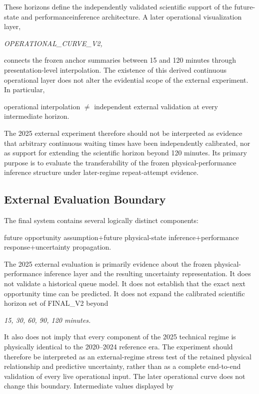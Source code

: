 These horizons define the independently validated scientific support of the future-state and performanceinference architecture. A later operational visualization layer,

\begin{center}\textit{OPERATIONAL\_CURVE\_V2,}\end{center}

connects the frozen anchor summaries between 15 and 120 minutes through presentation-level interpolation. The existence of this derived continuous operational layer does not alter the evidential scope of the external experiment. In particular,

operational interpolation \ensuremath{\neq} independent external validation at every intermediate horizon.

The 2025 external experiment therefore should not be interpreted as evidence that arbitrary continuous waiting times have been independently calibrated, nor as support for extending the scientific horizon beyond 120 minutes. Its primary purpose is to evaluate the transferability of the frozen physical-performance inference structure under later-regime repeat-attempt evidence.

\subsection{External Evaluation Boundary}
The final system contains several logically distinct components:

future opportunity assumption+future physical-state inference+performance response+uncertainty propagation.

The 2025 external evaluation is primarily evidence about the frozen physical-performance inference layer and the resulting uncertainty representation. It does not validate a historical queue model. It does not establish that the exact next opportunity time can be predicted. It does not expand the calibrated scientific horizon set of FINAL\_V2 beyond

\begin{center}\textit{15, 30, 60, 90, 120 minutes.}\end{center}

It also does not imply that every component of the 2025 technical regime is physically identical to the 2020--2024 reference era. The experiment should therefore be interpreted as an external-regime stress test of the retained physical relationship and predictive uncertainty, rather than as a complete end-to-end validation of every live operational input. The later operational curve does not change this boundary. Intermediate values displayed by

